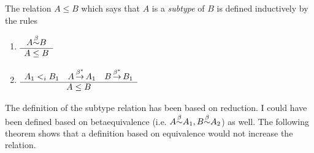 \begin{definition}
    \label{def:Subtype}
    The relation $A \le B$ which says that $A$ is a \emph{subtype} of $B$ is
    defined inductively by the rules
    \begin{enumerate}
        \item $\begin{array}{c} A {\stackrel{\beta}{\sim}} B \\ \hline A \le B\end{array}$

        \item $
            \begin{array}{c} A_1 <_i B_1
            \quad A {\,\stackrel{\beta^*}{\to}\,} A_1
            \quad B {\,\stackrel{\beta^*}{\to}\,} B_1 \\ \hline A \le B\end{array}
            $
    \end{enumerate}
\end{definition}


The definition of the subtype relation has been based on reduction. I could have
been defined based on betaequivalence (i.e. $A {\stackrel{\beta}{\sim}} A_1, B {\stackrel{\beta}{\sim}} A_2$) as
well. The following theorem shows that a definition based on equivalence would
not increase the relation.


